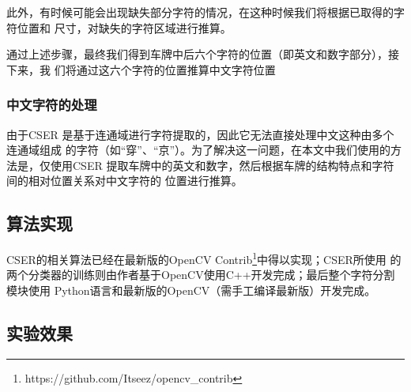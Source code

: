 此外，有时候可能会出现缺失部分字符的情况，在这种时候我们将根据已取得的字符位置和
尺寸，对缺失的字符区域进行推算。

通过上述步骤，最终我们得到车牌中后六个字符的位置（即英文和数字部分），接下来，我
们将通过这六个字符的位置推算中文字符位置

\subsubsection{中文字符的处理}

由于CSER 是基于连通域进行字符提取的，因此它无法直接处理中文这种由多个连通域组成
的字符（如“穿”、“京”）。为了解决这一问题，在本文中我们使用的方法是，仅使用CSER
提取车牌中的英文和数字，然后根据车牌的结构特点和字符间的相对位置关系对中文字符的
位置进行推算。

\subsection{算法实现}

CSER的相关算法已经在最新版的OpenCV
Contrib\footnote{https://github.com/Itseez/opencv\_contrib}中得以实现；CSER所使用
的两个分类器的训练则由作者基于OpenCV使用C++开发完成；最后整个字符分割模块使用
Python语言和最新版的OpenCV（需手工编译最新版）开发完成。

\subsection{实验效果}

